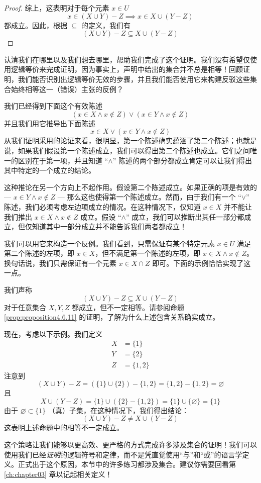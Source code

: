 \begin{proof}
    综上，这表明对于每个元素 $x \in U$ 
    \[x \in (X \cup Y ) - Z \implies x \in X \cup (Y - Z)\]
    都成立。因此，根据 $\subseteq$ 的定义，我们有
    \[(X \cup Y ) - Z \subseteq X \cup (Y - Z)\]
\end{proof}

认清我们在哪里以及我们想去哪里，帮助我们完成了这个证明。我们没有希望仅使用逻辑等价来完成证明，因为事实上，声明中给出的集合并不总是相等！回顾证明，我们能否识别出逻辑等价无效的步骤，并且我们能否使用它来构建反驳这些集合始终相等这一（错误）主张的反例？

我们已经得到下面这个有效陈述
\[(x \in X \land x \notin Z) \lor (x \in Y \land x \notin Z)\]
并且我们用它推导出下面陈述
\[x \in X \lor (x \in Y \land x \notin Z)\]
从我们证明采用的论证来看，很明显，第一个陈述确实蕴涵了第二个陈述；也就是说，如果我们假设第一个陈述成立，我们可以得出第二个陈述也成立。它们之间唯一的区别在于第一项，并且知道 ``$\land$'' 陈述的两个部分都成立肯定可以让我们得出其中特定的一个成立的结论。

这种推论在另一个方向上不起作用。假设第二个陈述成立。如果正确的项是有效的 --- $x \in Y \land x \notin Z$ --- 那么这也使得第一个陈述成立。然而，由于我们有一个 ``$\lor$'' 陈述，我们必须考虑左边项成立的情况。在这种情况下，仅知道 $x \in X$ 并不能让我们推出 $x \in X \land x \notin Z$ 成立。假设 ``$\land$'' 成立，我们可以推断出其任一部分都成立，但仅知道其中一部分成立并不能告诉我们两者都成立！

我们可以用它来构造一个反例。我们看到，只需保证有某个特定元素 $x \in U$ 满足第二个陈述的左项，即 $x \in X$，但不满足第一个陈述的左项，即 $x \in X \land x \notin Z$。换句话说，我们只需保证有一个元素 $x \in X \cap Z$ 即可。下面的示例恰恰实现了这一点。\\

\begin{example}
    我们声称
    \[(X \cup Y ) - Z \subseteq X \cup (Y - Z)\]
    对于任意集合 $X,Y,Z$ 都成立，但不一定相等。请参阅命题 \ref{prop:proposition4.6.11} 的证明，了解为什么上述包含关系确实成立。
\end{example}

现在，考虑以下示例。我们定义
\begin{align*}
    X &= \{1\} \\
    Y &= \{2\} \\
    Z &= \{1, 2\}
\end{align*}
注意到
\[(X \cup Y ) - Z = (\{1\} \cup \{2\}) - \{1, 2\} = \{1, 2\} - \{1, 2\} = \varnothing\]
且
\[X \cup (Y - Z) = \{1\} \cup (\{2\} - \{1, 2\}) = \{1\} \cup \{\varnothing\} = \{1\}\]
由于 $\varnothing \subset \{1\}$ （真）子集，在这种情况下，我们得出结论：
\[(X \cup Y ) - Z \ne X \cup (Y - Z)\]
这表明上述命题中的相等不一定成立。

这个策略让我们能够以更高效、更严格的方式完成许多涉及集合的证明！我们可以使用我们已经\emph{证明}的逻辑符号和定律，而不是凭直觉使用``与''和``或''的语言学定义。正式出于这个原因，本节中的许多练习都涉及集合。建议你需要回看第 \ref{ch:chapter03} 章以记起相关定义！
